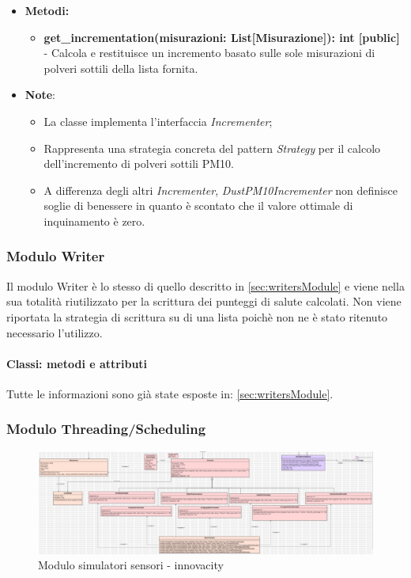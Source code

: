 \begin{itemize}
    \begin{itemize}
    \item \textbf{Metodi: } 
    \begin{itemize}
        \item \textbf{get\_incrementation(misurazioni: List[Misurazione]): int [public]} - Calcola e restituisce un incremento basato sulle sole misurazioni di polveri sottili della lista fornita.
    \end{itemize}
    \item\textbf{Note}:
        \begin{itemize}
            \item La classe implementa l'interfaccia \textit{Incrementer};
            \item Rappresenta una strategia concreta del pattern \textit{Strategy} per il calcolo dell'incremento di polveri sottili PM10.
            \item A differenza degli altri \textit{Incrementer}, \textit{DustPM10Incrementer} non definisce soglie di benessere in quanto è scontato che il valore ottimale di inquinamento è zero.
        \end{itemize}
    \end{itemize}

\end{itemize}

\subsubsection{Modulo Writer}
Il modulo Writer è lo stesso di quello descritto in \ref*{sec:writersModule} e viene nella sua totalità riutilizzato per la scrittura dei punteggi di salute calcolati.
Non viene riportata la strategia di scrittura su di una lista poichè non ne è stato ritenuto necessario l'utilizzo.

\paragraph*{Classi: metodi e attributi}
Tutte le informazioni sono già state esposte in: \ref*{sec:writersModule}.

\subsubsection{Modulo Threading/Scheduling}
\begin{figure}[H]
    \centering
    \includegraphics[width=1\textwidth]{../Images/SpecificaTecnica/simulatoriSensori.PNG}
    \caption{Modulo simulatori sensori - innovacity}
    \label{fig: fddf}
\end{figure}

